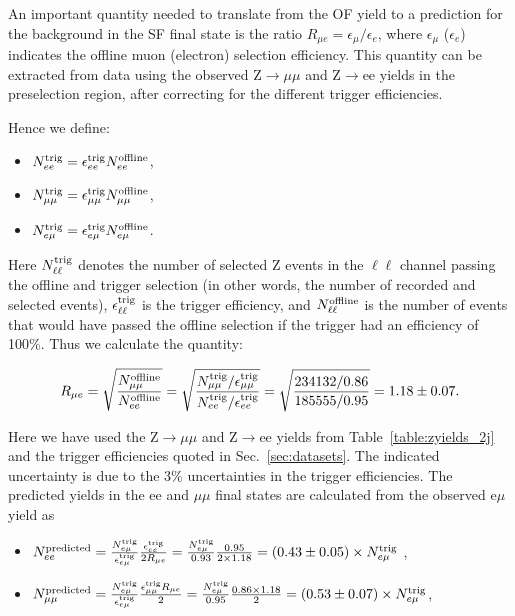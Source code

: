 An important quantity needed to translate from the OF yield to a prediction for the background in the SF final state is the ratio 
$R_{\mu e} = \epsilon_\mu / \epsilon_e$, where $\epsilon_\mu$ ($\epsilon_e$) indicates the offline muon (electron) selection efficiency. 
This quantity can be extracted from data using the observed Z$\to\mu\mu$ and Z$\to$ee yields in the preselection region, after correcting 
for the different trigger efficiencies.

Hence we define:

\begin{itemize}
\item $N_{ee}^{\rm{trig}} = \epsilon_{ee}^{\rm{trig}}N_{ee}^{\rm{offline}}$,
\item $N_{\mu\mu}^{\rm{trig}} = \epsilon_{\mu\mu}^{\rm{trig}}N_{\mu\mu}^{\rm{offline}}$,
\item $N_{e\mu}^{\rm{trig}} = \epsilon_{e\mu}^{\rm{trig}}N_{e\mu}^{\rm{offline}}$.
\end{itemize}
 
Here $N_{\ell\ell}^{\rm{trig}}$ denotes the number of selected Z events in the $\ell\ell$ channel passing the offline and trigger selection
(in other words, the number of recorded and selected events), $\epsilon_{\ell\ell}^{\rm{trig}}$ is the trigger efficiency, and 
$N_{\ell\ell}^{\rm{offline}}$ is the number of events that would have passed the offline selection if the trigger had an efficiency of 100\%.
Thus we calculate the quantity:

\begin{equation}
R_{\mu e} = \sqrt{\frac{N_{\mu\mu}^{\rm{offline}}}{N_{ee}^{\rm{offline}}}} = \sqrt{\frac{N_{\mu\mu}^{\rm{trig}}/\epsilon_{\mu\mu}^{\rm{trig}}}{N_{ee}^{\rm{trig}}/\epsilon_{ee}^{\rm{trig}}}} 
= \sqrt{\frac{234132/0.86}{185555/0.95}} = 1.18\pm0.07.
\end{equation}

Here we have used the Z$\to\mu\mu$ and Z$\to$ee yields from Table~\ref{table:zyields_2j} and the trigger efficiencies quoted in Sec.~\ref{sec:datasets}.
The indicated uncertainty is due to the 3\% uncertainties in the trigger efficiencies. %
The predicted yields in the ee and $\mu\mu$ final states are calculated from the observed e$\mu$ yield as

\begin{itemize}
\item $N_{ee}^{\rm{predicted}}    = \frac {N_{e\mu}^{\rm{trig}}} {\epsilon_{e\mu}^{\rm{trig}}} \frac {\epsilon_{ee}^{\rm{trig}}} {2 R_{\mu e}} 
= \frac{N_{e\mu}^{\rm{trig}}}{0.93}\frac{0.95}{2\times1.18} = (0.43\pm0.05) \times N_{e\mu}^{\rm{trig}}$ ,
\item $N_{\mu\mu}^{\rm{predicted}} = \frac {N_{e\mu}^{\rm{trig}}} {\epsilon_{e\mu}^{\rm{trig}}} \frac {\epsilon_{\mu\mu}^{\rm{trig}} R_{\mu e}}  {2}
= \frac {N_{e\mu}^{\rm{trig}}} {0.95} \frac {0.86 \times 1.18}{2} = (0.53\pm0.07) \times N_{e\mu}^{\rm{trig}}$,
\end{itemize}

